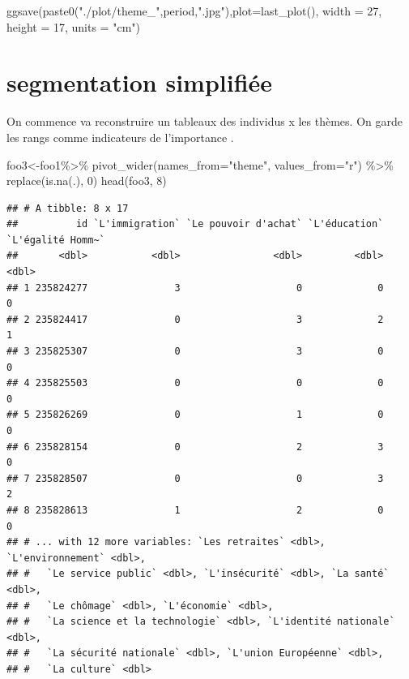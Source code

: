 \documentclass[
]{book}
\newenvironment{Shaded}{\begin{snugshade}}{\end{snugshade}}
\newcommand{\AttributeTok}[1]{\textcolor[rgb]{0.77,0.63,0.00}{#1}}
\newcommand{\DecValTok}[1]{\textcolor[rgb]{0.00,0.00,0.81}{#1}}
\newcommand{\FunctionTok}[1]{\textcolor[rgb]{0.00,0.00,0.00}{#1}}
\newcommand{\NormalTok}[1]{#1}
\newcommand{\OtherTok}[1]{\textcolor[rgb]{0.56,0.35,0.01}{#1}}
\newcommand{\SpecialCharTok}[1]{\textcolor[rgb]{0.00,0.00,0.00}{#1}}
\newcommand{\StringTok}[1]{\textcolor[rgb]{0.31,0.60,0.02}{#1}}
\begin{document}
\begin{Shaded}
\begin{Highlighting}[]
\FunctionTok{ggsave}\NormalTok{(}\FunctionTok{paste0}\NormalTok{(}\StringTok{"./plot/theme\_"}\NormalTok{,period,}\StringTok{".jpg"}\NormalTok{),}\AttributeTok{plot=}\FunctionTok{last\_plot}\NormalTok{(), }\AttributeTok{width =} \DecValTok{27}\NormalTok{, }\AttributeTok{height =} \DecValTok{17}\NormalTok{, }\AttributeTok{units =} \StringTok{"cm"}\NormalTok{)}
\end{Highlighting}
\end{Shaded}

\hypertarget{segmentation-simplifiuxe9e}{%
\section{segmentation simplifiée}\label{segmentation-simplifiuxe9e}}

On commence va reconstruire un tableaux des individus x les thèmes. On garde les rangs comme indicateurs de l'importance .

\begin{Shaded}
\begin{Highlighting}[]
\NormalTok{foo3}\OtherTok{\textless{}{-}}\NormalTok{foo1}\SpecialCharTok{\%\textgreater{}\%}  
  \FunctionTok{pivot\_wider}\NormalTok{(}\AttributeTok{names\_from=}\StringTok{"theme"}\NormalTok{, }\AttributeTok{values\_from=}\StringTok{"r"}\NormalTok{) }\SpecialCharTok{\%\textgreater{}\%}
  \FunctionTok{replace}\NormalTok{(}\FunctionTok{is.na}\NormalTok{(.), }\DecValTok{0}\NormalTok{)}
\FunctionTok{head}\NormalTok{(foo3, }\DecValTok{8}\NormalTok{)}
\end{Highlighting}
\end{Shaded}

\begin{verbatim}
## # A tibble: 8 x 17
##          id `L'immigration` `Le pouvoir d'achat` `L'éducation` `L'égalité Homm~`
##       <dbl>           <dbl>                <dbl>         <dbl>             <dbl>
## 1 235824277               3                    0             0                 0
## 2 235824417               0                    3             2                 1
## 3 235825307               0                    3             0                 0
## 4 235825503               0                    0             0                 0
## 5 235826269               0                    1             0                 0
## 6 235828154               0                    2             3                 0
## 7 235828507               0                    0             3                 2
## 8 235828613               1                    2             0                 0
## # ... with 12 more variables: `Les retraites` <dbl>, `L'environnement` <dbl>,
## #   `Le service public` <dbl>, `L'insécurité` <dbl>, `La santé` <dbl>,
## #   `Le chômage` <dbl>, `L'économie` <dbl>,
## #   `La science et la technologie` <dbl>, `L'identité nationale` <dbl>,
## #   `La sécurité nationale` <dbl>, `L'union Européenne` <dbl>,
## #   `La culture` <dbl>
\end{verbatim}
\end{document}
